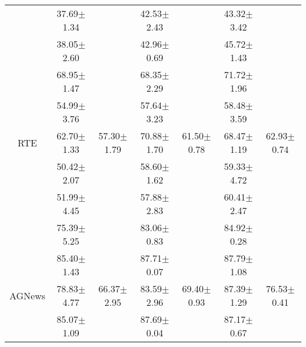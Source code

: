\begin{table*}[h]
\begin{tabular}{c|cc|cc|cc|}
\multicolumn{1}{|c|}{}       & \multicolumn{1}{c|}{37.69$\pm$1.34} &                   & \multicolumn{1}{c|}{42.53$\pm$2.43} &                   & \multicolumn{1}{c|}{43.32$\pm$3.42} &                   \\
\multicolumn{1}{|c|}{}       & \multicolumn{1}{c|}{38.05$\pm$2.60} &                   & \multicolumn{1}{c|}{42.96$\pm$0.69} &                   & \multicolumn{1}{c|}{45.72$\pm$1.43} &                   \\ \hline
\multicolumn{1}{|c|}{}       & \multicolumn{1}{c|}{68.95$\pm$1.47} &                   & \multicolumn{1}{c|}{68.35$\pm$2.29} &                   & \multicolumn{1}{c|}{71.72$\pm$1.96} &                   \\
\multicolumn{1}{|c|}{}       & \multicolumn{1}{c|}{54.99$\pm$3.76} &                   & \multicolumn{1}{c|}{57.64$\pm$3.23} &                   & \multicolumn{1}{c|}{58.48$\pm$3.59} &                   \\
\multicolumn{1}{|c|}{RTE}    & \multicolumn{1}{c|}{62.70$\pm$1.33} & 57.30$\pm$1.79    & \multicolumn{1}{c|}{70.88$\pm$1.70} & 61.50$\pm$0.78    & \multicolumn{1}{c|}{68.47$\pm$1.19} & 62.93$\pm$0.74 \\
\multicolumn{1}{|c|}{}       & \multicolumn{1}{c|}{50.42$\pm$2.07} &                   & \multicolumn{1}{c|}{58.60$\pm$1.62} &                   & \multicolumn{1}{c|}{59.33$\pm$4.72} &                   \\
\multicolumn{1}{|c|}{}       & \multicolumn{1}{c|}{51.99$\pm$4.45} &                   & \multicolumn{1}{c|}{57.88$\pm$2.83} &                   & \multicolumn{1}{c|}{60.41$\pm$2.47} &                   \\ \hline
\multicolumn{1}{|c|}{}       & \multicolumn{1}{c|}{75.39$\pm$5.25} &                   & \multicolumn{1}{c|}{83.06$\pm$0.83} &                   & \multicolumn{1}{c|}{84.92$\pm$0.28} &                   \\
\multicolumn{1}{|c|}{}       & \multicolumn{1}{c|}{85.40$\pm$1.43} &                   & \multicolumn{1}{c|}{87.71$\pm$0.07} &                   & \multicolumn{1}{c|}{87.79$\pm$1.08} &                   \\
\multicolumn{1}{|c|}{AGNews} & \multicolumn{1}{c|}{78.83$\pm$4.77} & 66.37$\pm$2.95    & \multicolumn{1}{c|}{83.59$\pm$2.96} & 69.40$\pm$0.93    & \multicolumn{1}{c|}{87.39$\pm$1.29} & 76.53$\pm$0.41 \\
\multicolumn{1}{|c|}{}       & \multicolumn{1}{c|}{85.07$\pm$1.09} &                   & \multicolumn{1}{c|}{87.69$\pm$0.04} &                   & \multicolumn{1}{c|}{87.17$\pm$0.67} &                   \\

\end{tabular}
\end{table*}
